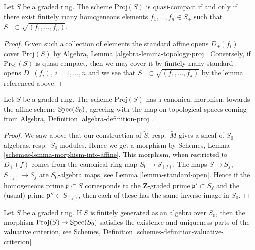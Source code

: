 \begin{lemma}
\label{lemma-proj-quasi-compact}
Let $S$ be a graded ring.
The scheme $\text{Proj}(S)$ is quasi-compact if and only
if there exist finitely many homogeneous elements
$f_1, \ldots, f_n \in S_{+}$ such that
$S_{+} \subset \sqrt{(f_1, \ldots, f_n)}$.
\end{lemma}

\begin{proof}
Given such a collection of elements the standard affine opens
$D_{+}(f_i)$ cover $\text{Proj}(S)$ by
Algebra, Lemma \ref{algebra-lemma-topology-proj}.
Conversely, if $\text{Proj}(S)$ is quasi-compact, then we
may cover it by finitely many standard opens
$D_{+}(f_i)$, $i = 1, \ldots, n$ and we see that
$S_{+} \subset \sqrt{(f_1, \ldots, f_n)}$ by the
lemma referenced above.
\end{proof}

\begin{lemma}
\label{lemma-structure-morphism-proj}
Let $S$ be a graded ring. The scheme $\text{Proj}(S)$ has a canonical morphism
towards the affine scheme $\mathop{\rm Spec}(S_0)$, agreeing with the map on
topological spaces coming from
Algebra, Definition \ref{algebra-definition-proj}.
\end{lemma}

\begin{proof}
We saw above that our construction of $\widetilde S$, resp.\ 
$\widetilde M$ gives a sheaf of $S_0$-algebras, resp.\ $S_0$-modules.
Hence we get a morphism by
Schemes, Lemma \ref{schemes-lemma-morphism-into-affine}.
This morphism, when restricted to $D_{+}(f)$ comes from the
canonical ring map $S_0 \to S_{(f)}$. The maps
$S \to S_f$, $S_{(f)} \to S_f$ are $S_0$-algebra maps, see
Lemma \ref{lemma-standard-open}.
Hence if the homogeneous prime $\mathfrak p \subset S$
corresponds to the $\mathbf{Z}$-graded prime $\mathfrak p' \subset S_f$
and the (usual) prime $\mathfrak p'' \subset S_{(f)}$, then
each of these has the same inverse image in $S_0$.
\end{proof}

\begin{lemma}
\label{lemma-proj-valuative-criterion}
Let $S$ be a graded ring. If $S$ is finitely generated as
an algebra over $S_0$, then
the morphism $\text{Proj}(S) \to \mathop{\rm Spec}(S_0)$ satisfies
the existence and uniqueness parts of the valuative criterion,
see Schemes, Definition \ref{schemes-definition-valuative-criterion}.
\end{lemma}

